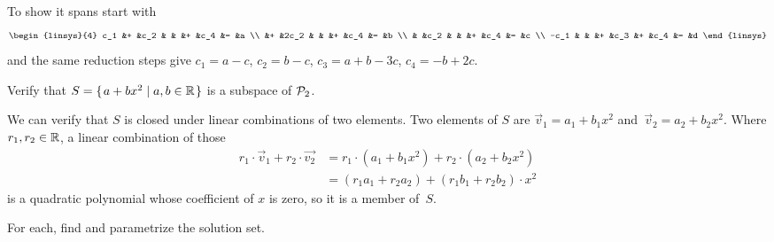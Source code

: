 \documentclass[11pt,answers]{examjh}
\begin{document}
\begin{questions}
\begin{parts}
\begin{solution}[1.75in]
To show it spans start with
\begin{equation*}
  \begin{linsys}{4}
  c_1  &+  &c_2  &   &    &+  &c_4  &=  &a  \\
       &+  &2c_2 &   &    &+  &c_4  &=  &b  \\
       &   &c_2  &   &    &+  &c_4  &=  &c  \\
  -c_1 &   &     &+  &c_3 &+  &c_4  &=  &d  
  \end{linsys}
\end{equation*}
and the same reduction steps give
$c_1=a-c$, $c_2=b-c$, $c_3=a+b-3c$, $c_4=-b+2c$.
\end{solution}
\end{parts}



\question
Verify that   $S=\mbox{$\{\hspace{0.1em}a+bx^2\mid a,b\in\mathbb{R}\hspace{0.1em}\}$}$
is a subspace of $\mathcal{P}_2$.
\begin{solution}[1.5in]
We can verify that $S$ is closed under linear combinations of two elements.
Two elements of $S$ are $\vec{v}_1=a_1+b_1x^2$ and~$\vec{v}_2=a_2+b_2x^2$.
Where $r_1,r_2\in\mathbb{R}$, a linear combination of those
\begin{align*}
  r_1\cdot\vec{v}_1+r_2\cdot\vec{v_2}
  &=r_1\cdot (a_1+b_1x^2)+r_2\cdot (a_2+b_2x^2) \\
  &=(r_1a_1+r_2a_2)+(r_1b_1+r_2b_2)\cdot x^2
\end{align*}
is a quadratic polynomial whose coefficient of $x$ is zero,
so it is a member of~$S$.
\end{solution}



\question
For each, find and parametrize the solution set.
\begin{parts}

\end{parts}
\end{questions}
\end{document}

